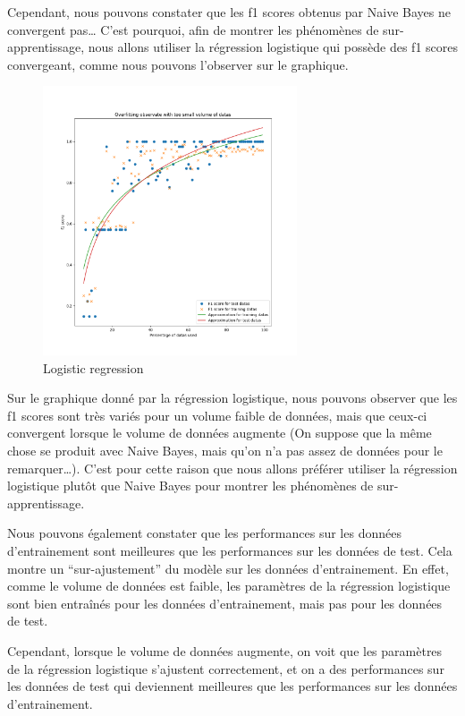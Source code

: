 \documentclass[
]{article}
\begin{document}
Cependant, nous pouvons constater que les f1 scores obtenus par Naive
Bayes ne convergent pas\ldots{} C'est pourquoi, afin de montrer les
phénomènes de sur-apprentissage, nous allons utiliser la régression
logistique qui possède des f1 scores convergeant, comme nous pouvons
l'observer sur le graphique.

\begin{figure}
\centering
\includegraphics[width=0.67\textwidth,height=\textheight]{../res/overfitting_reg.png}
\caption{Logistic regression}
\end{figure}

Sur le graphique donné par la régression logistique, nous pouvons
observer que les f1 scores sont très variés pour un volume faible de
données, mais que ceux-ci convergent lorsque le volume de données
augmente (On suppose que la même chose se produit avec Naive Bayes, mais
qu'on n'a pas assez de données pour le remarquer\ldots). C'est pour
cette raison que nous allons préférer utiliser la régression logistique
plutôt que Naive Bayes pour montrer les phénomènes de sur-apprentissage.

Nous pouvons également constater que les performances sur les données
d'entrainement sont meilleures que les performances sur les données de
test. Cela montre un ``sur-ajustement'' du modèle sur les données
d'entrainement. En effet, comme le volume de données est faible, les
paramètres de la régression logistique sont bien entraînés pour les
données d'entrainement, mais pas pour les données de test.

Cependant, lorsque le volume de données augmente, on voit que les
paramètres de la régression logistique s'ajustent correctement, et on a
des performances sur les données de test qui deviennent meilleures que
les performances sur les données d'entrainement.
\end{document}
